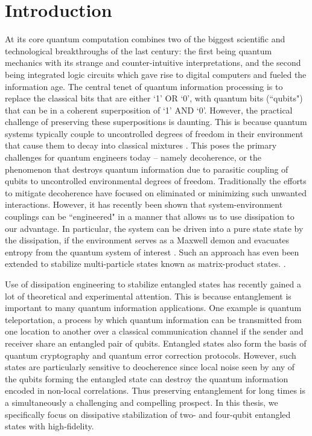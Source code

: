\chapter{Introduction}


At its core quantum computation combines two of the biggest scientific and technological breakthroughs of the last century: the first being quantum mechanics with its strange and counter-intuitive interpretations, and the second being integrated logic circuits which gave rise to digital computers and fueled the information age. The central tenet of quantum information processing is to replace the classical bits that are either `1' OR `0', with quantum bits (``qubits") that can be in a coherent superposition of `1' AND `0'. However, the practical challenge of preserving these superpositions is daunting. This is because quantum systems typically couple to uncontrolled degrees of freedom in their environment that cause them to decay into classical mixtures \cite{Wiring_up_quantum_systems}. This poses the primary challenges for quantum engineers today -- namely decoherence, or the phenomenon that destroys quantum information due to parasitic coupling of qubits to uncontrolled environmental degrees of freedom. Traditionally the efforts to mitigate decoherence have focused on eliminated or minimizing such unwanted interactions. However, it has recently been shown that system-environment couplings can be ``engineered" in a manner that allows us to use dissipation to our advantage. In particular, the system can be driven into a pure state state by the dissipation, if the environment serves as a Maxwell demon and evacuates entropy from the quantum system of interest 
\cite{Dissipative_Universal_Quantum_Computing}. Such an approach has even been extended to stabilize multi-particle states known as matrix-product states. \cite{Dissipative_State_Engineering_Zoller, Cooling_Atoms_into_Entangled_States,PhysRevLett.106.090502}. 

Use of dissipation engineering to stabilize entangled states has recently gained a lot of theoretical and experimental attention. This is because entanglement is important to many quantum information applications. One example is quantum teleportation, a process by which quantum information can be transmitted from one location to another over a classical communication channel if the sender and receiver share an entangled pair of qubits. Entangled states also form the basis of quantum cryptography and quantum error correction protocols. However, such states are particularly sensitive to deocherence since local noise seen by any of the qubits forming the entangled state can destroy the quantum information encoded in non-local correlations. Thus preserving entanglement for long times is a simultaneously a challenging and compelling prospect. In this thesis, we specifically focus on dissipative stabilization of two- and four-qubit entangled states with high-fidelity.

